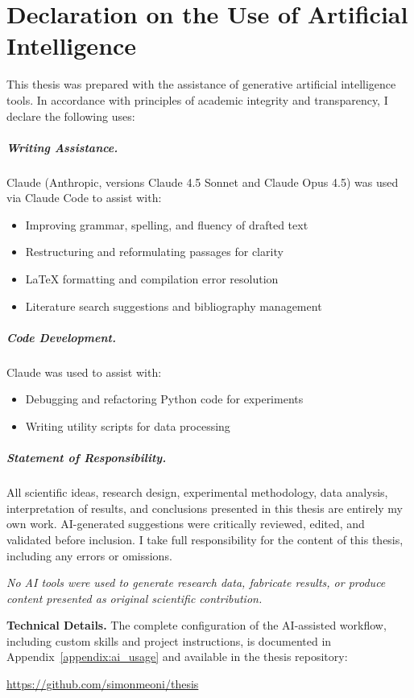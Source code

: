 \chapter*{Declaration on the Use of Artificial Intelligence}
\mtcaddchapter

This thesis was prepared with the assistance of generative artificial intelligence tools.
In accordance with principles of academic integrity and transparency, I declare the following uses:

\paragraph{Writing Assistance.}
Claude (Anthropic, versions Claude 4.5 Sonnet and Claude Opus 4.5) was used via Claude Code to assist with:
\begin{itemize}
    \item Improving grammar, spelling, and fluency of drafted text
    \item Restructuring and reformulating passages for clarity
    \item LaTeX formatting and compilation error resolution
    \item Literature search suggestions and bibliography management
\end{itemize}

\paragraph{Code Development.}
Claude was used to assist with:
\begin{itemize}
    \item Debugging and refactoring Python code for experiments
    \item Writing utility scripts for data processing
\end{itemize}

\paragraph{Statement of Responsibility.}
All scientific ideas, research design, experimental methodology, data analysis, interpretation of results, and conclusions presented in this thesis are entirely my own work.
AI-generated suggestions were critically reviewed, edited, and validated before inclusion.
I take full responsibility for the content of this thesis, including any errors or omissions.

\vspace{1cm}
\noindent
\textit{No AI tools were used to generate research data, fabricate results, or produce content presented as original scientific contribution.}

\vspace{1cm}
\noindent
\textbf{Technical Details.}
The complete configuration of the AI-assisted workflow, including custom skills and project instructions, is documented in Appendix~\ref{appendix:ai_usage} and available in the thesis repository:

\begin{center}
\url{https://github.com/simonmeoni/thesis}
\end{center}
